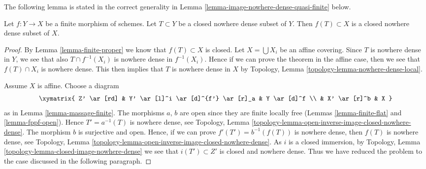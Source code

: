 \noindent
The following lemma is stated in the correct generality
in Lemma \ref{lemma-image-nowhere-dense-quasi-finite} below.

\begin{lemma}
\label{lemma-image-nowhere-dense-finite}
Let $f : Y \to X$ be a finite morphism of schemes.
Let $T \subset Y$ be a closed nowhere dense subset of $Y$.
Then $f(T) \subset X$ is a closed nowhere dense subset of $X$.
\end{lemma}

\begin{proof}
By Lemma \ref{lemma-finite-proper} we know that $f(T) \subset X$ is closed.
Let $X = \bigcup X_i$ be an affine covering.
Since $T$ is nowhere dense in $Y$, we see that also $T \cap f^{-1}(X_i)$
is nowhere dense in $f^{-1}(X_i)$. Hence if we can prove the theorem in the
affine case, then we see that $f(T) \cap X_i$ is nowhere dense.
This then implies that $T$ is nowhere dense in $X$ by
Topology, Lemma \ref{topology-lemma-nowhere-dense-local}.

\medskip\noindent
Assume $X$ is affine. Choose a diagram
$$
\xymatrix{
Z' \ar[rd] &
Y' \ar[l]^i \ar[d]^{f'} \ar[r]_a &
Y \ar[d]^f \\
 & X' \ar[r]^b & X
}
$$
as in Lemma \ref{lemma-massage-finite}. The morphisms $a$, $b$ are
open since they are finite locally free
(Lemmas \ref{lemma-finite-flat} and \ref{lemma-fppf-open}).
Hence $T' = a^{-1}(T)$ is nowhere dense, see
Topology, Lemma \ref{topology-lemma-open-inverse-image-closed-nowhere-dense}.
The morphism $b$ is surjective and open.
Hence, if we can prove $f'(T') = b^{-1}(f(T))$ is
nowhere dense, then $f(T)$ is nowhere dense, see
Topology, Lemma \ref{topology-lemma-open-inverse-image-closed-nowhere-dense}.
As $i$ is a closed immersion, by
Topology, Lemma \ref{topology-lemma-closed-image-nowhere-dense}
we see that $i(T') \subset Z'$ is closed and nowhere dense.
Thus we have reduced the problem to the case discussed
in the following paragraph.


\end{proof}
